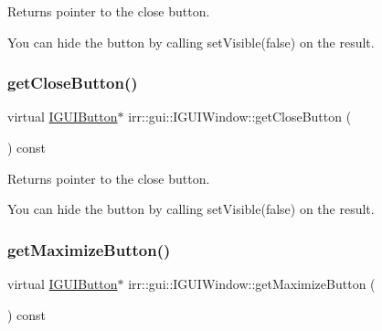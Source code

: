 Returns pointer to the close button. 

You can hide the button by calling set\+Visible(false) on the result. \mbox{\label{classirr_1_1gui_1_1IGUIWindow_ae5b6abf3c9d8d0af5539adf3fea8db70}} 
\subsubsection{\texorpdfstring{get\+Close\+Button()}{getCloseButton()}\hspace{0.1cm}{\footnotesize\ttfamily [2/2]}}
{\footnotesize\ttfamily virtual \hyperlink{classirr_1_1gui_1_1IGUIButton}{I\+G\+U\+I\+Button}$\ast$ irr\+::gui\+::\+I\+G\+U\+I\+Window\+::get\+Close\+Button (\begin{DoxyParamCaption}{ }\end{DoxyParamCaption}) const\hspace{0.3cm}{\ttfamily [pure virtual]}}



Returns pointer to the close button. 

You can hide the button by calling set\+Visible(false) on the result. \mbox{\label{classirr_1_1gui_1_1IGUIWindow_a7b5976907664ed8603f3a603079d3b15}} 
\subsubsection{\texorpdfstring{get\+Maximize\+Button()}{getMaximizeButton()}\hspace{0.1cm}{\footnotesize\ttfamily [1/2]}}
{\footnotesize\ttfamily virtual \hyperlink{classirr_1_1gui_1_1IGUIButton}{I\+G\+U\+I\+Button}$\ast$ irr\+::gui\+::\+I\+G\+U\+I\+Window\+::get\+Maximize\+Button (\begin{DoxyParamCaption}{ }\end{DoxyParamCaption}) const\hspace{0.3cm}{\ttfamily [pure virtual]}}



